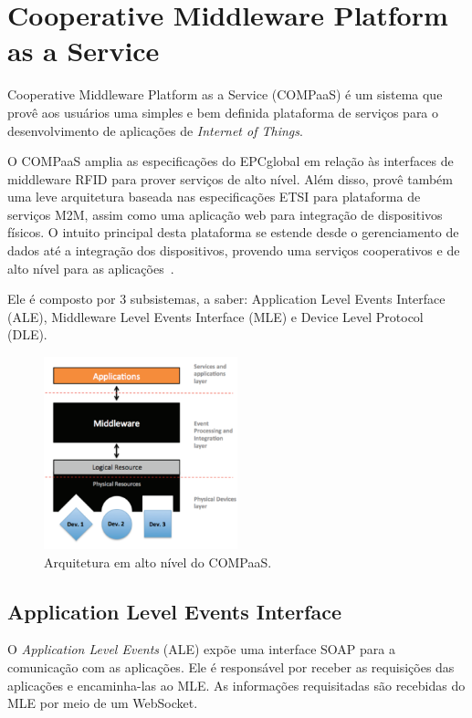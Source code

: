 \section{Cooperative Middleware Platform as a Service}
\label{sec:COMPaaS}
Cooperative Middleware Platform as a Service (COMPaaS) é um sistema que provê aos usuários uma simples e bem
definida plataforma de serviços para o desenvolvimento de aplicações de \textit{Internet of Things}.

O COMPaaS amplia as especificações do EPCglobal em relação às interfaces de middleware RFID para
prover serviços de alto nível. Além disso, provê também uma leve arquitetura baseada nas especificações
ETSI para plataforma de serviços M2M, assim como uma aplicação web para integração de dispositivos físicos.
O intuito principal desta plataforma se estende desde o gerenciamento de dados até a integração dos
dispositivos, provendo uma serviços cooperativos e de alto nível para as aplicações~\cite{COMPaaS}.

Ele é composto por 3 subsistemas, a saber:  Application Level Events
Interface (ALE), Middleware Level Events Interface (MLE) e Device Level Protocol (DLE).

\begin{figure}[H]
	\centering
		\includegraphics[width=0.5\textwidth]{fig/compaas_arch.png}
	\caption{Arquitetura em alto nível do COMPaaS.}
\end{figure}

\subsection{Application Level Events Interface}
O \textit{Application Level Events} (ALE) expõe uma interface SOAP para a comunicação com as aplicações.
Ele é responsável por receber as requisições das aplicações e encaminha-las ao MLE. As informações
requisitadas são recebidas do MLE por meio de um WebSocket.

